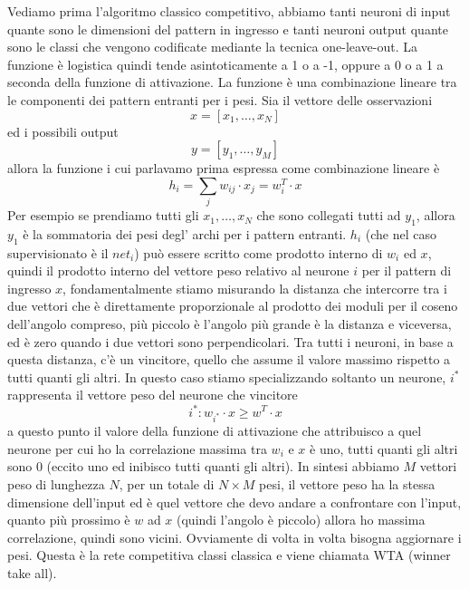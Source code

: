 \noindent Vediamo prima l'algoritmo classico competitivo, abbiamo tanti neuroni di input quante sono le dimensioni del pattern in ingresso e tanti neuroni output quante sono le classi che vengono codificate mediante la tecnica one-leave-out. La funzione è logistica quindi tende asintoticamente a 1 o a -1, oppure a 0 o a 1 a seconda della funzione di attivazione. 
La funzione è una combinazione lineare tra le componenti dei pattern entranti per i pesi. Sia il vettore delle osservazioni
\begin{equation}
x = [x_1, \dots, x_N]
\end{equation}
ed i possibili output
\begin{equation}
y = [y_1, \dots, y_M]
\end{equation}
allora la funzione i cui parlavamo prima espressa come combinazione lineare è
\begin{equation}
h_i = \sum_j w_{ij} \cdot x_j = w_i^T \cdot x
\end{equation}
Per esempio se prendiamo tutti gli $x_1, \dots, x_N$ che sono collegati tutti ad $y_1$, allora $y_1$ è la sommatoria dei pesi degl' archi per i pattern entranti. $h_i$ (che nel caso supervisionato è il $net_i$) può essere scritto come prodotto interno di $w_i$ ed $x$, quindi il prodotto interno del vettore peso relativo al neurone $i$ per il pattern di ingresso $x$, fondamentalmente stiamo misurando la distanza che intercorre tra i due vettori che è direttamente proporzionale al prodotto dei moduli per il coseno dell'angolo compreso,  più piccolo è l'angolo più grande è la distanza e viceversa, ed è zero quando i due vettori sono perpendicolari. Tra tutti i neuroni, in base a questa distanza, c'è un vincitore, quello che assume il valore massimo rispetto a tutti quanti gli altri. In questo caso stiamo specializzando soltanto un neurone, $i^*$ rappresenta il vettore peso del neurone che vincitore
\begin{equation}
i^* : w_{i^*} \cdot x \geq w^T \cdot x
\end{equation}
a questo punto il valore della funzione di attivazione che attribuisco a quel neurone per cui ho la correlazione massima tra $w_i$ e $x$ è uno, tutti quanti gli altri sono 0 (eccito uno ed inibisco tutti quanti gli altri).  In sintesi abbiamo $M$ vettori peso di lunghezza $N$, per un totale di $N \times M$ pesi,  il vettore peso ha la stessa dimensione dell'input ed è quel vettore che devo andare a confrontare con l'input, quanto più prossimo è $w$ ad $x$ (quindi l'angolo è piccolo) allora ho massima correlazione, quindi sono vicini. Ovviamente di volta in volta bisogna aggiornare i pesi. Questa è la rete competitiva classi classica e viene chiamata WTA (winner take all). \\

